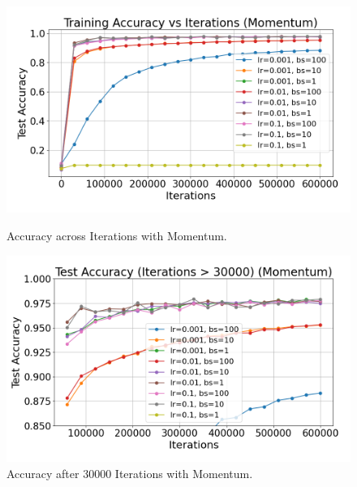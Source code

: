 \begin{figure}[h]
    \centering
    \begin{minipage}[b]{0.45\textwidth}
        \centering
        \includegraphics[width=\linewidth]{../data/part2/momentum/accuracy_training_plot_momentum}
        \caption{Accuracy across Iterations with Momentum.}
        \label{fig:training_momentum}
    \end{minipage}
    \hfill
    \begin{minipage}[b]{0.45\textwidth}
        \centering
        \includegraphics[width=\linewidth]{../data/part2/momentum/accuracy_training_plot_momentum_post_30000}
        \caption{Accuracy after 30000 Iterations with Momentum.}
        \label{fig:30000_momentum}
    \end{minipage}
\end{figure}

